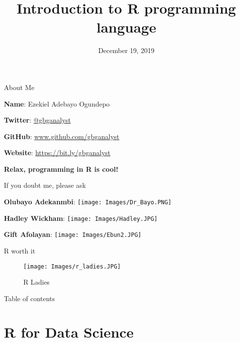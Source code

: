 \documentclass[
  ignorenonframetext,
]{beamer}
\title{Introduction to R programming language}
\date{December 19, 2019}
\begin{document}
\frame{\titlepage}

\begin{frame}{About Me}
	\protect\hypertarget{about-me}{}
	\pause
	
	\textbf{Name}: Ezekiel Adebayo Ogundepo \pause
	
	\textbf{Twitter}: \href{https://twitter.com/gbganalyst}{@gbganalyst}
	\pause
	
	\textbf{GitHub}: \url{www.github.com/gbganalyst} \pause
	
	\textbf{Website}: \url{https://bit.ly/gbganalyst}
	
\end{frame}


\begin{frame}
		\begin{center}
		\textbf{Relax, programming in R is cool!}
	\end{center}
	
	\pause
	
	If you doubt me, please ask \pause
	
	\begin{multicols}{3}
					\textbf{Olubayo Adekanmbi}: \texttt{[image: Images/Dr\_Bayo.PNG]} \pause
	
		\textbf{Hadley Wickham}: \texttt{[image: Images/Hadley.JPG]} \pause
	
		\textbf{Gift Afolayan}: \texttt{[image: Images/Ebun2.JPG]} 	
	\end{multicols}
\end{frame}

\begin{frame}{R worth it}
	\protect\hypertarget{r-worth-it}{}
	
	\begin{figure}
		\centering
		\texttt{[image: Images/r\_ladies.JPG]}
		\caption{R Ladies}
	\end{figure}
	
\end{frame}


\begin{frame}{Table of contents}
	\tableofcontents[hideallsubsections]
\end{frame}




\section{R for Data Science}
\end{document}

